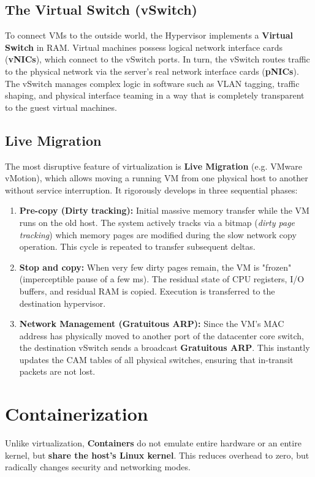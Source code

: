 \subsection{The Virtual Switch (vSwitch)}
To connect VMs to the outside world, the Hypervisor implements a \textbf{Virtual Switch} in RAM. Virtual machines possess logical network interface cards (\textbf{vNICs}), which connect to the vSwitch ports. In turn, the vSwitch routes traffic to the physical network via the server's real network interface cards (\textbf{pNICs}). The vSwitch manages complex logic in software such as VLAN tagging, traffic shaping, and physical interface teaming in a way that is completely transparent to the guest virtual machines.

\subsection{Live Migration}
The most disruptive feature of virtualization is \textbf{Live Migration} (e.g. VMware vMotion), which allows moving a running VM from one physical host to another without service interruption.
It rigorously develops in three sequential phases:
\begin{enumerate}
    \item \textbf{Pre-copy (Dirty tracking):} Initial massive memory transfer while the VM runs on the old host. The system actively tracks via a bitmap (\textit{dirty page tracking}) which memory pages are modified during the slow network copy operation. This cycle is repeated to transfer subsequent deltas.
    \item \textbf{Stop and copy:} When very few dirty pages remain, the VM is "frozen" (imperceptible pause of a few ms). The residual state of CPU registers, I/O buffers, and residual RAM is copied. Execution is transferred to the destination hypervisor.
    \item \textbf{Network Management (Gratuitous ARP):} Since the VM's MAC address has physically moved to another port of the datacenter core switch, the destination vSwitch sends a broadcast \textbf{Gratuitous ARP}. This instantly updates the CAM tables of all physical switches, ensuring that in-transit packets are not lost.
\end{enumerate}

\section{Containerization}
Unlike virtualization, \textbf{Containers} do not emulate entire hardware or an entire kernel, but \textbf{share the host's Linux kernel}. This reduces overhead to zero, but radically changes security and networking modes.

